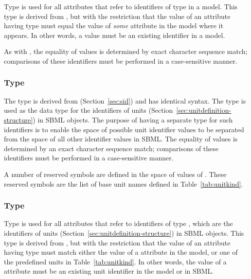 Type  is used for all attributes that refer to
identifiers of type  in a model.  This type is
derived from , but with the restriction that the
value of an attribute having type  must equal the
value of \emph{some}  attribute in the model where
it appears.  In other words, a  value must be an
existing identifier in a model.

As with , the equality of  values
is determined by exact character sequence match; \ie comparisons
of these identifiers must be performed in a case-sensitive manner.


\subsubsection{Type }
\label{sec:unitsid}

The type  is derived from 
(Section~\ref{sec:sid}) and has identical syntax.  The
 type is used as the data type for the
identifiers of units (Section~\ref{sec:unitdefinition-structure}) in SBML objects.
The purpose of having a separate type for such identifiers is
to enable the space of possible unit identifier values to be
separated from the space of all other identifier values in SBML.
The equality of  values is determined by an
exact character sequence match; \ie comparisons of these
identifiers must be performed in a case-sensitive manner.

A number of reserved symbols are defined in the space of values of
.  These reserved symbols are the list of base
unit names defined in Table~\vref{tab:unitkind}.


\subsubsection{Type }
\label{sec:unitsidref}

Type  is used for all attributes that refer
to identifiers of type , which are the
identifiers of units (Section~\ref{sec:unitdefinition-structure})
in SBML objects.  This type is derived from ,
but with the restriction that the value of an attribute having
type  must match either the value of a
 attribute in the model, or one of the
predefined units in Table~\vref{tab:unitkind}.  In other words,
the value of a  attribute must be an existing
unit identifier in the model or in SBML.

